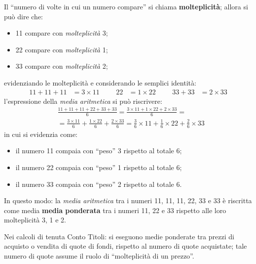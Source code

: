 \documentclass[12pt,a4paper]{article}
\begin{document}
Il ``numero  di volte  in cui  un numero  compare'' si  chiama \textbf{molteplicità};
allora si può dire che:
\begin{itemize}
\item \num{11} compare con \emph{molteplicità} \num{3};
\item \num{22} compare con \emph{molteplicità} \num{1};
\item \num{33} compare con \emph{molteplicità} \num{2};
\end{itemize}
evidenziando le molteplicità e considerando le semplici identità:
\begin{align*}
  \num{11} + \num{11} + \num{11} &= \num{3} \times{} \num{11} &&&
  \num{22} &= \num{1} \times{} \num{22} &&&
  \num{33} + \num{33} &= \num{2} \times{} \num{33}
\end{align*}
l'espressione della \emph{media aritmetica} si può riscrivere:
\begin{align*}
  &\frac{\num{11} + \num{11} + \num{11} + \num{22} + \num{33} + \num{33}}{6}
  = \frac{\num{3} \times{} \num{11}
    + \num{1} \times{} \num{22}
    + \num{2} \times{} \num{33}}
    {6} = \\
  &=
    \frac{\num{3} \times{} \num{11}}{6} +
    \frac{\num{1} \times{} \num{22}}{6} +
    \frac{\num{2} \times{} \num{33}}{6}
  =
    \frac{\num{3}}{6} \times{} \num{11} +
    \frac{\num{1}}{6} \times{} \num{22} +
    \frac{\num{2}}{6} \times{} \num{33}
\end{align*}
in cui si evidenzia come:
\begin{itemize}
\item il numero \num{11} compaia con ``peso'' \num{3} rispetto al totale \num{6};
\item il numero \num{22} compaia con ``peso'' \num{1} rispetto al totale \num{6};
\item il numero \num{33} compaia con ``peso'' \num{2} rispetto al totale \num{6}.
\end{itemize}

In questo modo: la \emph{media aritmetica} tra i numeri \num{11}, \num{11}, \num{11},
\num{22}, \num{33} e  \num{33} è riscritta come media \textbf{media  ponderata} tra i
numeri \num{11}, \num{22} e \num{33} rispetto alle loro molteplicità \num{3}, \num{1}
e \num{2}.

Nei  calcoli di  tenuta  Conto Titoli:  si  eseguono medie  ponderate  tra prezzi  di
acquisto o vendita  di quote di fondi,  rispetto al numero di  quote acquistate; tale
numero di quote assume il ruolo di ``molteplicità di un prezzo''.
\end{document}
